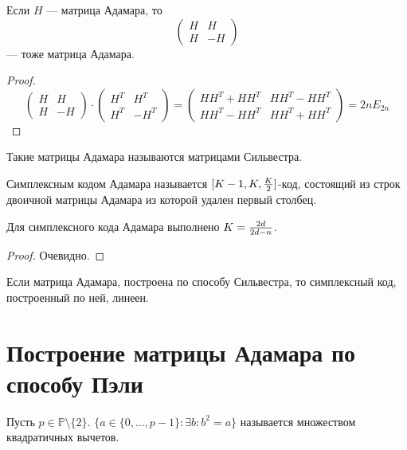 \begin{proposition}
Если $H$ --- матрица Адамара, то
$$\begin{pmatrix} H & H \\ H & -H \end{pmatrix}$$ --- тоже матрица Адамара.
\end{proposition}
\begin{proof}
$$\begin{pmatrix} H & H \\ H & -H \end{pmatrix} \cdot
   \begin{pmatrix} H^{T} & H^{T} \\ H^{T} & -H^{T} \end{pmatrix}
   = \begin{pmatrix} H H^{T} + H H^{T} & H H^{T} - H H^{T} \\
                      H H^{T} - H H^{T} & H H^{T} + H H^{T}\end{pmatrix} = 2n E_{2n}$$
\end{proof}

Такие матрицы Адамара называются матрицами Сильвестра.

\begin{definition}
Симплексным кодом Адамара называется $[K-1, K, {K \over 2}]$-код, состоящий
из строк двоичной матрицы Адамара из которой удален первый столбец.
\end{definition}

\begin{proposition}
Для симплексного кода Адамара выполнено $K = {2d \over 2d - n}$.
\end{proposition}
\begin{proof}
Очевидно.
\end{proof}

\begin{remark}
Если матрица Адамара, построена по способу Сильвестра, то симплексный код, 
построенный по ней, линеен.
\end{remark}

\section{Построение матрицы Адамара по способу Пэли}

\begin{definition}
Пусть $p \in \mathbb{P} \setminus \{2\}$. $\{a \in \{0,\ldots, p-1\}
  \colon \exists b \colon b^2 = a \}$ называется множеством
  квадратичных вычетов.
\end{definition}

